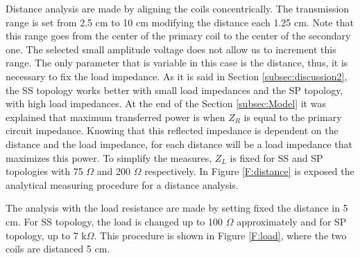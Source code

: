 Distance analysis are made by aligning the coils concentrically. The transmission range is set from 2.5 cm to 10 cm modifying the distance each 1.25 cm. Note that this range goes from the center of the primary coil to the center of the secondary one. The selected small amplitude voltage does not allow us to increment this range. The only parameter that is variable in this case is the distance, thus, it is necessary to fix the load impedance. As it is said in Section \ref{subsec:discussion2}, the SS topology works better with small load impedances and the SP topology, with high load impedances. At the end of the Section \ref{subsec:Model} it was explained that maximum transferred power is when $Z_R$ is equal to the primary circuit impedance. Knowing that this reflected impedance is dependent on the distance and the load impedance, for each distance will be a load impedance that maximizes this power. To simplify the measures, $Z_L$ is fixed for SS and SP topologies with 75 $\Omega$ and 200 $\Omega$ respectively. In Figure \ref{F:distance} is exposed the analytical measuring procedure for a distance analysis.

The analysis with the load resistance are made by setting fixed the distance in 5 cm. For SS topology, the load is changed up to 100 $\Omega$ approximately and for SP topology, up to 7 k$\Omega$. This procedure is shown in Figure \ref{F:load}, where the two coils are distanced 5 cm.

